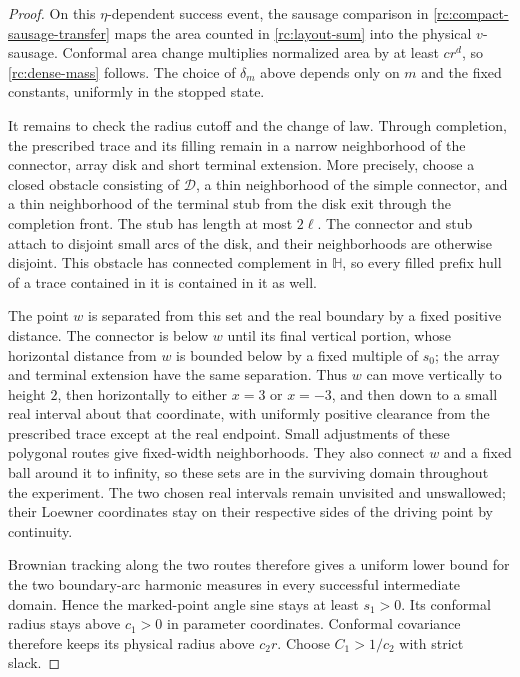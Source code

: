 \documentclass[11pt]{article}
\theoremstyle{definition}
\theoremstyle{remark}
\numberwithin{equation}{section}
\begin{document}
\begin{proof}
On this $\eta$-dependent success event, the sausage comparison in
\eqref{rc:compact-sausage-transfer} maps the area counted in
\eqref{rc:layout-sum} into the physical $v$-sausage. Conformal area
change multiplies normalized area by at least $c r^d$, so
\eqref{rc:dense-mass} follows. The choice of $\delta_m$ above depends
only on $m$ and the fixed constants, uniformly in the stopped state.

It remains to check the radius cutoff and the change of law.  Through
completion, the prescribed trace and its filling remain in a narrow
neighborhood of the connector, array disk and short terminal extension.
More precisely, choose a closed obstacle consisting of $\mathcal D$,
a thin neighborhood of the simple connector, and a thin neighborhood of
the terminal stub from the disk exit through the completion front.
The stub has length at most $2\ell$. The connector and stub attach to
disjoint small arcs of the disk, and their neighborhoods are otherwise
disjoint. This obstacle has
connected complement in $\mathbb H$, so every filled prefix hull of a
trace contained in it is contained in it as well.

The point $w$ is separated from this set and the real boundary by a
fixed positive distance.  The connector is below $w$ until its final
vertical portion, whose horizontal distance from $w$ is bounded below
by a fixed multiple of $s_0$; the array and terminal extension have the
same separation.  Thus $w$ can move vertically to height $2$, then
horizontally to either $x=3$ or $x=-3$, and then down to a small real
interval about that coordinate, with uniformly positive clearance from
the prescribed trace except at the real endpoint.  Small adjustments
of these polygonal routes give fixed-width neighborhoods.  They also
connect $w$ and a fixed ball around it to infinity, so these sets are
in the surviving domain throughout the experiment.  The two chosen
real intervals remain unvisited and unswallowed; their Loewner
coordinates stay on their respective sides of the driving point by
continuity.

Brownian tracking along the two routes therefore gives
a uniform lower bound for the two boundary-arc harmonic measures in
every successful intermediate domain.  Hence the
marked-point angle sine stays at least $s_1>0$.  Its conformal radius
stays above $c_1>0$ in parameter coordinates.  Conformal covariance
therefore keeps its physical radius above $c_2r$.  Choose $C_1>1/c_2$
with strict slack.


\end{proof}
\end{document}
